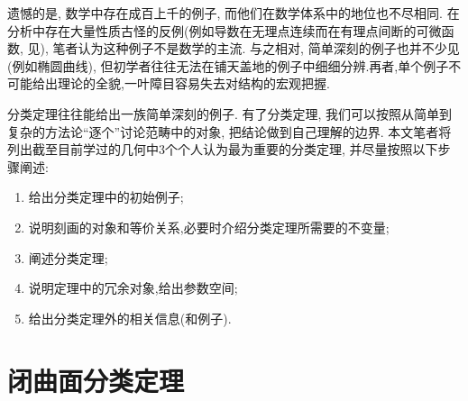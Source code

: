 \documentclass[UTF8,12pt,twoside]{article}
\theoremstyle{definition}
\numberwithin{equation}{section}
\begin{document}
遗憾的是, 数学中存在成百上千的例子, 而他们在数学体系中的地位也不尽相同. 在分析中存在大量性质古怪的反例(例如导数在无理点连续而在有理点间断的可微函数, 见\cite{wanglin2014}), 笔者认为这种例子不是数学的主流. 与之相对, 简单深刻的例子也并不少见(例如椭圆曲线), 但初学者往往无法在铺天盖地的例子中细细分辨.再者,单个例子不可能给出理论的全貌,一叶障目容易失去对结构的宏观把握.

分类定理往往能给出一族简单深刻的例子. 有了分类定理, 我们可以按照从简单到复杂的方法论“逐个”讨论范畴中的对象, 把结论做到自己理解的边界. 本文笔者将列出截至目前学过的几何中3个个人认为最为重要的分类定理, 并尽量按照以下步骤阐述: 
\begin{enumerate}
	\setlength{\itemsep}{0pt}
	\setlength{\parsep}{0pt}
	\setlength{\parskip}{0pt}
	\item 给出分类定理中的初始例子;      
	\item 说明刻画的对象和等价关系,必要时介绍分类定理所需要的不变量;      
	\item 阐述分类定理;      
	\item 说明定理中的冗余对象,给出参数空间;
	\item 给出分类定理外的相关信息(和例子).
\end{enumerate}

\section{闭曲面分类定理}
\end{document}
